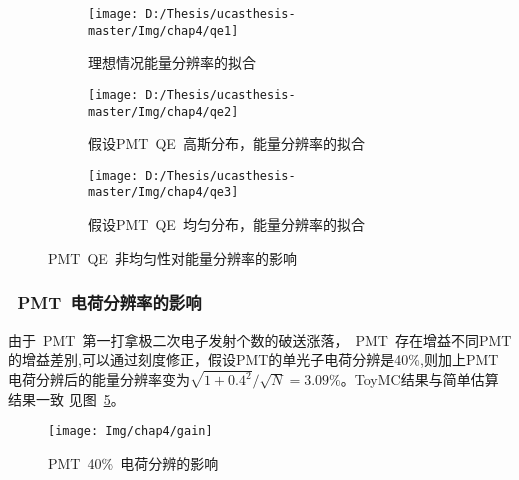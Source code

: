 \begin{figure}[!htbp]
  \centering
  \begin{subfigure}[b]{\MySubFactor\textwidth}
    \texttt{[image: D:/Thesis/ucasthesis-master/Img/chap4/qe1]}
    \caption{理想情况能量分辨率的拟合 \quad\quad\quad\quad\quad\quad }
    \label{fig:qe_1}
  \end{subfigure}%
   \quad\quad\quad\quad\quad\quad%
  \begin{subfigure}[b]{\MySubFactor\textwidth}
    \texttt{[image: D:/Thesis/ucasthesis-master/Img/chap4/qe2]}
    \caption{假设PMT~QE~高斯分布，能量分辨率的拟合}
    \label{fig:qe_2}
  \end{subfigure}
  \begin{subfigure}[b]{\MySubFactor\textwidth}
    \texttt{[image: D:/Thesis/ucasthesis-master/Img/chap4/qe3]}
    \caption{假设PMT~QE~均匀分布，能量分辨率的拟合}
    \label{fig:qe_3}
  \end{subfigure}%
  \caption{PMT~QE~非均匀性对能量分辨率的影响}
  \label{fig:qe}
\end{figure}


\subsubsection{~PMT~电荷分辨率的影响}
由于~PMT~第一打拿极二次电子发射个数的破送涨落，~PMT~存在增益不同PMT的增益差別,可以通过刻度修正，假设PMT的单光子电荷分辨是40\%,则加上PMT电荷分辨后的能量分辨率变为$\sqrt{1+0.4^2}/\sqrt{N}=3.09\%$。ToyMC结果与简单估算结果一致 见图~\ref{fig:gain}。
  \begin{figure}[!htbp]
  \centering
   \texttt{[image: Img/chap4/gain]}
    \caption{PMT~40\%~电荷分辨的影响 }
  \label{fig:gain}
\end{figure}


